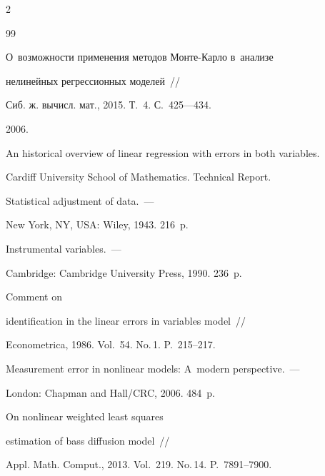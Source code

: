 \begin{multicols}{2}
{{\begin{thebibliography}{99}

  О~возможности применения методов Мон\-те-Кар\-ло в~анализе

нелинейных регрессионных моделей~//

Сиб. ж. вычисл. мат., 2015. Т.~4. С.~425---434.




 2006.  

An historical overview of linear regression with errors in both variables.

Cardiff University School of Mathematics. Technical Report.




  {Statistical adjustment of data.}~---

New York, NY, USA: Wiley, 1943.  216~p.





{Instrumental variables}.~---

Cambridge: Cambridge University Press, 1990. 236~p.




  Comment on

  identification in the linear errors in variables model~//

{Econometrica}, 1986. Vol.~54. No.\,1. P.~215--217.





{Measurement error in nonlinear models: A~modern perspective}.~---

London: Chapman and Hall/CRC, 2006. 484~p.





On nonlinear weighted least squares

  estimation of bass diffusion model~//

{Appl. Math. Comput.}, 2013.  Vol.~219. No.\,14. P.~7891--7900.




\end{thebibliography}}}
\end{multicols}
